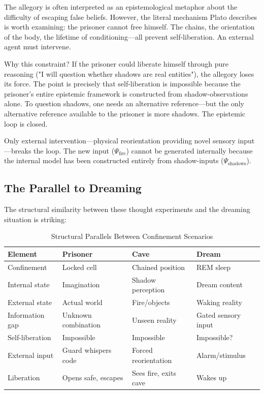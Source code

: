 \documentclass[11pt,a4paper]{article}
\begin{document}
The allegory is often interpreted as an epistemological metaphor about the difficulty of escaping false beliefs. However, the literal mechanism Plato describes is worth examining: the prisoner cannot free himself. The chains, the orientation of the body, the lifetime of conditioning—all prevent self-liberation. An external agent must intervene.

Why this constraint? If the prisoner could liberate himself through pure reasoning ("I will question whether shadows are real entities"), the allegory loses its force. The point is precisely that self-liberation is impossible because the prisoner's entire epistemic framework is constructed from shadow-observations alone. To question shadows, one needs an alternative reference—but the only alternative reference available to the prisoner is more shadows. The epistemic loop is closed.

Only external intervention—physical reorientation providing novel sensory input—breaks the loop. The new input ($\Psi_{\text{fire}}$) cannot be generated internally because the internal model has been constructed entirely from shadow-inputs ($\Psi_{\text{shadows}}$).

\subsection{The Parallel to Dreaming}

The structural similarity between these thought experiments and the dreaming situation is striking:

\begin{table}[H]
\centering
\caption{Structural Parallels Between Confinement Scenarios}
\begin{tabular}{@{}llll@{}}
\toprule
\textbf{Element} & \textbf{Prisoner} & \textbf{Cave} & \textbf{Dream} \\
\midrule
Confinement & Locked cell & Chained position & REM sleep \\
Internal state & Imagination & Shadow perception & Dream content \\
External state & Actual world & Fire/objects & Waking reality \\
Information gap & Unknown combination & Unseen reality & Gated sensory input \\
Self-liberation & Impossible & Impossible & Impossible? \\
External input & Guard whispers code & Forced reorientation & Alarm/stimulus \\
Liberation & Opens safe, escapes & Sees fire, exits cave & Wakes up \\
\bottomrule
\end{tabular}
\label{tab:parallels}
\end{table}
\end{document}
